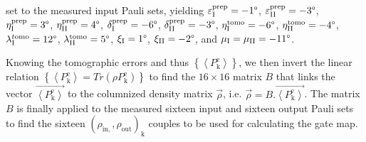 set to the measured input Pauli sets, yielding $\varepsilon_{\mathrm{I}}^{\mathrm{prep}}=-1\text{\textdegree}$,
$\varepsilon_{\mathrm{II}}^{\mathrm{prep}}=-3\text{\textdegree}$,
$\eta_{\mathrm{I}}^{\mathrm{prep}}=3\text{\textdegree}$, $\mathrm{\eta}_{\mathrm{II}}^{\mathrm{prep}}=4\text{\textdegree}$,
$\delta_{\mathrm{I}}^{\mathrm{prep}}=-6\text{\textdegree}$, $\delta_{\mathrm{II}}^{\mathrm{prep}}=-3\text{\textdegree}$,
$\eta_{\mathrm{I}}^{\mathrm{tomo}}=-6\text{\textdegree}$, $\eta_{\mathrm{II}}^{\mathrm{tomo}}=-4\text{\textdegree}$,
$\lambda_{\mathrm{I}}^{t\mathrm{omo}}=12\text{\textdegree}$, $\lambda_{\mathrm{II}}^{\mathrm{tomo}}=5\text{\textdegree}$,
$\xi_{\mathrm{I}}=1\text{\textdegree}$, $\xi_{\mathrm{II}}=-2\text{\textdegree}$,
and $\mu_{\mathrm{I}}=\mu_{\mathrm{II}}=-11\text{\textdegree}$.

Knowing the tomographic errors and thus $\left\{ \left\langle P_{\mathrm{k}}^{\mathrm{e}}\right\rangle \right\} $,
we then invert the linear relation $\left\{ \left\langle P_{\mathrm{k}}^{\mathrm{e}}\right\rangle =Tr\left(\rho P_{\mathrm{k}}^{\mathrm{e}}\right)\right\} $
to find the $16\times16$ matrix $B$ that links the vector $\overrightarrow{\left\langle P_{\mathrm{k}}^{\mathrm{e}}\right\rangle }$
to the columnized density matrix $\overrightarrow{\rho}$, i.e. $\overrightarrow{\rho}=B.\overrightarrow{\left\langle P_{\mathrm{k}}^{\mathrm{e}}\right\rangle }$.
The matrix $B$ is finally applied to the measured sixteen input and
sixteen output Pauli sets to find the sixteen $(\rho_{\mathrm{in},},\rho_{\mathrm{out}})_{\mathrm{k}}$
couples to be used for calculating the gate map.



